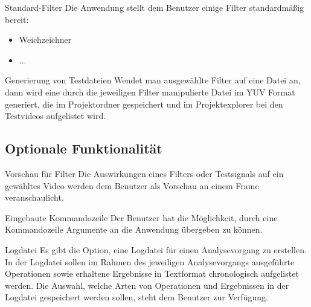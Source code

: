  Standard-Filter
\newline
Die Anwendung stellt dem Benutzer einige Filter standardmäßig bereit:
\begin{itemize}
\item Weichzeichner
\item ...
\end{itemize}

 Generierung von Testdateien
\newline
Wendet man ausgewählte Filter auf eine Datei an, dann wird eine durch die jeweiligen Filter manipulierte Datei im \gls{YUV} Format generiert, die im Projektordner gespeichert und im Projektexplorer bei den Testvideos aufgelistet wird.





\subsection{Optionale Funktionalität}

 Vorschau für Filter
\newline
Die Auswirkungen eines Filters oder Testsignals auf ein gewähltes Video werden dem Benutzer als Vorschau an einem Frame veranschaulicht.


 Eingebaute Kommandozeile
\newline
Der Benutzer hat die Möglichkeit, durch eine Kommandozeile Argumente an die Anwendung übergeben zu können.

 Logdatei
\newline
Es gibt die Option, eine Logdatei für einen Analysevorgang zu erstellen. In der Logdatei sollen im Rahmen
 des jeweiligen Analysevorgangs ausgeführte Operationen sowie erhaltene Ergebnisse in Textformat
  chronologisch aufgelistet werden. Die Auswahl, welche Arten von Operationen und Ergebnissen in der
   Logdatei gespeichert werden sollen, steht dem Benutzer zur Verfügung.
